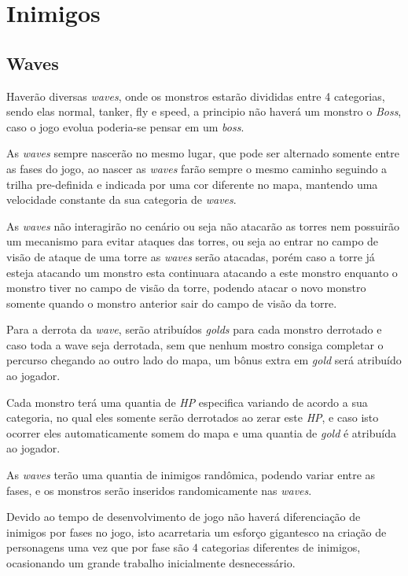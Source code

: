 \documentclass[11pt]{article} %
\begin{document}
\section{Inimigos}
\subsection{Waves} 

Haverão diversas \textit{waves}, onde os monstros estarão divididas entre 4 categorias, sendo elas normal, tanker, fly e  speed, a principio não haverá um monstro o \textit{Boss}, caso o jogo evolua poderia-se pensar em um \textit{boss}.

As \textit{waves} sempre nascerão no mesmo lugar, que pode ser alternado somente entre as fases do jogo, ao nascer as \textit{waves} farão sempre o mesmo caminho seguindo a trilha pre-definida e indicada por uma cor diferente no mapa, mantendo uma velocidade constante da sua categoria de \textit{waves}. 

As \textit{waves} não interagirão no cenário ou seja não atacarão as torres nem possuirão um mecanismo para evitar ataques das torres, ou seja ao entrar no campo de visão de ataque de uma torre as \textit{waves} serão atacadas, porém caso a torre já esteja atacando um monstro esta continuara atacando a este monstro enquanto o monstro tiver no campo de visão da torre, podendo atacar o novo monstro somente quando o monstro anterior sair do campo de visão da torre.  

Para a derrota da \textit{wave}, serão atribuídos \textit{golds} para cada monstro derrotado e caso toda a wave seja derrotada, sem que nenhum mostro consiga completar o percurso chegando ao outro lado do mapa, um bônus extra em \textit{gold} será atribuído ao jogador. 

Cada monstro terá uma quantia de \textit{HP} especifica variando de acordo a sua categoria, no qual eles somente serão derrotados ao zerar este \textit{HP}, e caso isto ocorrer eles automaticamente somem do mapa e uma quantia de \textit{gold} é atribuída ao jogador.

As \textit{waves} terão uma quantia de inimigos randômica, podendo variar entre as fases, e os monstros serão inseridos randomicamente nas \textit{waves}.

Devido ao tempo de desenvolvimento de jogo não haverá diferenciação de inimigos por fases no jogo, isto acarretaria um esforço gigantesco na criação de personagens uma vez que por fase são 4 categorias diferentes de inimigos, ocasionando um grande trabalho inicialmente desnecessário. 
\end{document}
